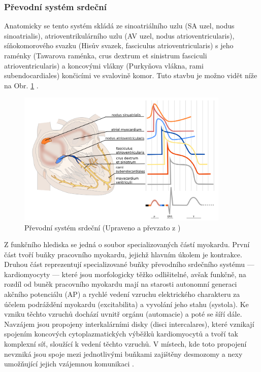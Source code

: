 \subsubsection{Převodní systém srdeční}
\label{section:pss}
Anatomicky se tento systém skládá ze sinoatriálního uzlu (SA uzel, nodus
sinoatrialis), atrioventrikulárního uzlu (AV uzel, nodus atrioventricularis),
síňokomorového svazku (Hisův svazek, fasciculus atrioventricularis) s jeho
raménky (Tawarova raménka, crus dextrum et sinistrum fasciculi
atrioventricularis) a koncovými vlákny (Purkyňova vlákna, rami subendocardiales)
končicími ve svalovině komor. Tuto stavbu je možno vidět níže na Obr.
\ref{img:pss} \cite{Dylevsky2013}.

\begin{figure}[h]
	\begin{center}
		\includegraphics[width=0.9\textwidth]{../assets/anatomy/pss}
		\caption{Převodní systém srdeční (Upraveno a převzato z
			\cite{ecgpediaConduction})}
		\label{img:pss}
	\end{center}
\end{figure}

Z funkčního hlediska se jedná o soubor specializovaných částí myokardu. První
část tvoří buňky pracovního myokardu, jejichž hlavním úkolem je kontrakce.
Druhou část reprezentují specializované buňky převodního srdečního systému ---
kardiomyocyty --- které jsou morfologicky těžko odlišitelné, avšak funkčně, na
rozdíl od buněk pracovního myokardu mají na starosti autonomní generaci akčního
potenciálu (AP) a rychlé vedení vzruchu elektrického charakteru za účelem
podráždění myokardu (excitabilita) a vyvolání jeho stahu (systola). Ke vzniku
těchto vzruchů dochází uvnitř orgánu (automacie) a poté se šíří dále. Navzájem
jsou propojeny interkalárními disky (disci intercalares), které vznikají
spojením koncových cytoplazmatických výběžků kardiomyocytů a tvoří tak komplexní
síť, sloužící k vedení těchto vzruchů. V místech, kde toto propojení nevzniká
jsou spoje mezi jednotlivými buňkami zajištěny desmozomy a nexy umožňující
jejich vzájemnou komunikaci \cite{Dylevsky2013,Cihak2016}.

